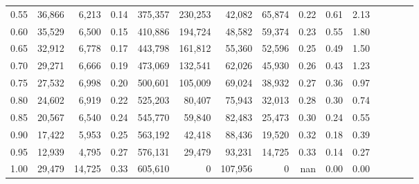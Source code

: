 \begin{tabular}{rrrcrrrrrrrrrrr}
0.55 &  36,866 &   6,213 &                                       0.14 &  375,357 &  230,253 &   42,082 &   65,874 &  0.22 &  0.61 &                         2.13 \\
0.60 &  35,529 &   6,500 &                                       0.15 &  410,886 &  194,724 &   48,582 &   59,374 &  0.23 &  0.55 &                         1.80 \\
0.65 &  32,912 &   6,778 &                                       0.17 &  443,798 &  161,812 &   55,360 &   52,596 &  0.25 &  0.49 &                         1.50 \\
0.70 &  29,271 &   6,666 &                                       0.19 &  473,069 &  132,541 &   62,026 &   45,930 &  0.26 &  0.43 &                         1.23 \\
0.75 &  27,532 &   6,998 &                                       0.20 &  500,601 &  105,009 &   69,024 &   38,932 &  0.27 &  0.36 &                         0.97 \\
0.80 &  24,602 &   6,919 &                                       0.22 &  525,203 &   80,407 &   75,943 &   32,013 &  0.28 &  0.30 &                         0.74 \\
0.85 &  20,567 &   6,540 &                                       0.24 &  545,770 &   59,840 &   82,483 &   25,473 &  0.30 &  0.24 &                         0.55 \\
0.90 &  17,422 &   5,953 &                                       0.25 &  563,192 &   42,418 &   88,436 &   19,520 &  0.32 &  0.18 &                         0.39 \\
0.95 &  12,939 &   4,795 &                                       0.27 &  576,131 &   29,479 &   93,231 &   14,725 &  0.33 &  0.14 &                         0.27 \\
1.00 &  29,479 &  14,725 &                                       0.33 &  605,610 &        0 &  107,956 &        0 &   nan &  0.00 &                         0.00 \\
\bottomrule
\end{tabular}

